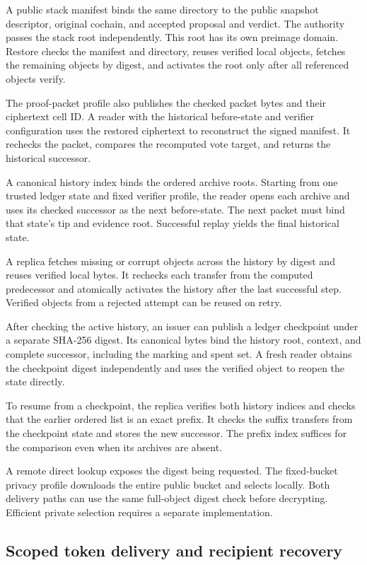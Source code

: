 A public stack manifest binds the same directory to the public snapshot
descriptor, original cochain, and accepted proposal and verdict. The authority
passes the stack root independently. This root has its own preimage domain.
Restore checks the manifest and directory, reuses verified local objects,
fetches the remaining objects by digest, and activates the root only after
all referenced objects verify.

The proof-packet profile also publishes the checked packet bytes and their
ciphertext cell ID. A reader with the historical before-state and verifier
configuration uses the restored ciphertext to reconstruct the signed manifest.
It rechecks the packet, compares the recomputed vote target, and returns the
historical successor.

A canonical history index binds the ordered archive roots. Starting from one
trusted ledger state and fixed verifier profile, the reader opens each archive
and uses its checked successor as the next before-state. The next packet must
bind that state's tip and evidence root. Successful replay yields the final
historical state.

A replica fetches missing or corrupt objects across the history by digest and
reuses verified local bytes. It rechecks each transfer from the computed
predecessor and atomically activates the history after the last successful
step. Verified objects from a rejected attempt can be reused on retry.

After checking the active history, an issuer can publish a ledger checkpoint
under a separate SHA-256 digest. Its canonical bytes bind the history root,
context, and complete successor, including the marking and spent set.
A fresh reader obtains the checkpoint digest independently and uses the
verified object to reopen the state directly.

To resume from a checkpoint, the replica verifies both history indices and
checks that the earlier ordered list is an exact prefix. It checks the suffix
transfers from the checkpoint state and stores the new successor. The prefix
index suffices for the comparison even when its archives are absent.

A remote direct lookup exposes the digest being requested. The fixed-bucket
privacy profile downloads the entire public bucket and selects locally.
Both delivery paths can use the same full-object digest check before
decrypting. Efficient private selection requires a separate implementation.

\subsection{Scoped token delivery and recipient recovery}


